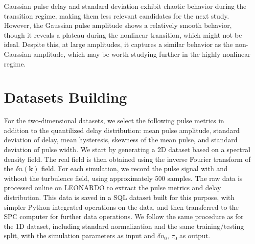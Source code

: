 \documentclass[11pt,a4paper,openany]{report}
\begin{document}
\begin{multicols}{2}
    Gaussian pulse delay and standard deviation exhibit chaotic behavior during the transition regime, making them less relevant candidates for the next study. However, the Gaussian pulse amplitude shows a relatively smooth behavior, though it reveals a plateau during the nonlinear transition, which might not be ideal. Despite this, at large amplitudes, it captures a similar behavior as the non-Gaussian amplitude, which may be worth studying further in the highly nonlinear regime.



    \section{Datasets Building}

    For the two-dimensional datasets, we select the following pulse metrics in addition to the quantilized delay distribution: mean pulse amplitude, standard deviation of delay, mean hysteresis, skewness of the mean pulse, and standard deviation of pulse width. We start by generating a 2D dataset based on a spectral density field. The real field is then obtained using the inverse Fourier transform of the $\delta n(\textbf{k})$ field. For each simulation, we record the pulse signal with and without the turbulence field, using approximately 500 samples. The raw data is processed online on LEONARDO to extract the pulse metrics and delay distribution. This data is saved in a SQL dataset built for this purpose, with simpler Python integrated operations on the data, and then transferred to the SPC computer for further data operations. We follow the same procedure as for the 1D dataset, including standard normalization and the same training/testing split, with the simulation parameters as input and $\delta n_0$, $\tau_0$ as output.

\end{multicols}
\end{document}

